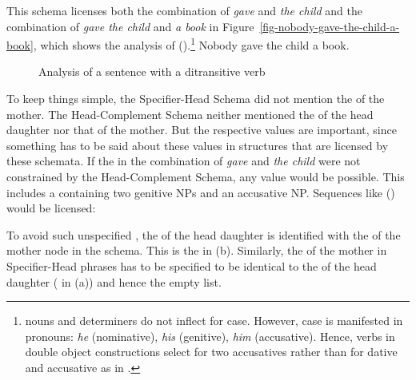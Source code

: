 This schema licenses both the combination of \emph{gave} and \emph{the child} and the combination of
\emph{gave the child} and \emph{a book} in Figure~\vref{fig-nobody-gave-the-child-a-book}, which shows the
analysis of ().\footnote{%
   nouns and determiners do not inflect for case. However, case is manifested in pronouns:
  \emph{he} (nominative), \emph{his} (genitive), \emph{him} (accusative). Hence, verbs in double object
  constructions select for two accusatives rather than for dative and accusative as in . 
}
\ea
\label{ex-nobody-gave-the-child-a-book}
Nobody gave the child a book.
\z
\begin{figure}
\caption{\label{fig-nobody-gave-the-child-a-book}Analysis of a sentence with a ditransitive verb}
\end{figure}

To keep things simple, the Specifier-Head Schema did not mention the \compsv of the mother. The
Head-Complement Schema neither mentioned the \sprv of the head daughter nor that of the mother. But the
respective values are important, since something has to be said about these values in structures
that are licensed by these schemata. If the \sprv in the combination of \emph{gave} and \emph{the
  child} were not constrained by the Head-Complement Schema, any value would be possible. This
includes a \sprl containing two genitive NPs and an accusative NP. Sequences like () would be
licensed:

\z
To avoid such unspecified \sprvs, the \sprv of the head daughter is identified with the \sprv of the
mother node in the schema. This is the  in (b). Similarly, the \compsv of the mother
in Specifier-Head phrases has to be specified to be identical to the \compsv of the head daughter
( in (a)) and hence the empty list.


